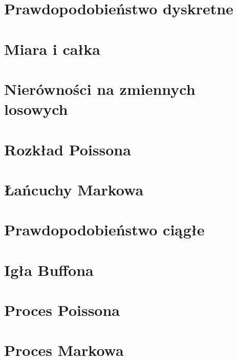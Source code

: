 \documentclass[12pt, a4paper, polish, openany]{book}
\author{
}
\begin{document}
\frontmatter



\tableofcontents


\mainmatter

\chapter{Prawdopodobieństwo dyskretne}


\chapter{Miara i całka}


\chapter{Nierówności na zmiennych losowych}


\chapter{Rozkład Poissona}


\chapter{Łańcuchy Markowa}


\chapter{Prawdopodobieństwo ciągłe}


\chapter{Igła Buffona}


\chapter{Proces Poissona}


\chapter{Proces Markowa}

\end{document}
